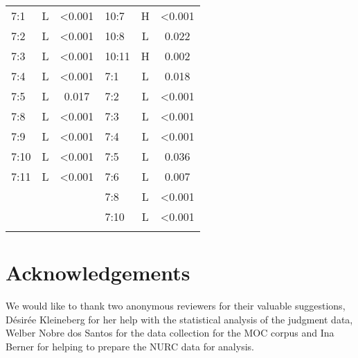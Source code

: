 \documentclass[output=paper]{langscibook}
\begin{document}
\begin{table}[H]
\begin{tabular}{ *2{lcS[table-format=<1.3]} }
			7:1   & L & <0.001     &  10:7  & H & <0.001\\
			7:2   & L & <0.001     &  10:8  & L & 0.022\\
			7:3   & L & <0.001     &  10:11   & H & 0.002\\
			7:4   & L & <0.001     &  7:1   & L & 0.018\\
			7:5   & L & 0.017      &   7:2   & L & <0.001\\
			7:8   & L & <0.001     &  7:3   & L & <0.001\\
			7:9   & L & <0.001     &  7:4   & L & <0.001\\
			7:10   & L & <0.001    & 7:5   & L & 0.036\\
			7:11   & L & <0.001    & 7:6   & L & 0.007\\
			       &   &           &   7:8   & L & <0.001\\
			       &   &           &   7:10  & L & <0.001\\
			\lspbottomrule
		\end{tabular}
\end{table}

\section*{Acknowledgements}


We would like to thank two anonymous reviewers for their valuable suggestions, Désirée Kleineberg for her help with the statistical analysis of the judgment data, Welber Nobre dos Santos for the data collection for the MOC corpus and Ina Berner for helping to prepare the NURC data for analysis.

\printbibliography[heading=subbibliography]
\end{document}
